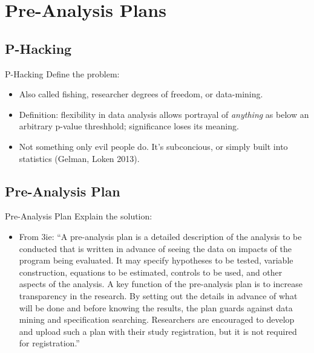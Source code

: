 \documentclass{beamer}
\begin{document}
\section{Pre-Analysis Plans}
\subsection*{P-Hacking}
\begin{frame}[<.->]{P-Hacking}
Define the problem:
\begin{itemize}
\item
Also called fishing, researcher degrees of freedom, or data-mining.
\item
Definition: flexibility in data analysis allows portrayal of \textit{anything} as below an arbitrary p-value threshhold; significance loses its meaning.
\item
Not something only evil people do. It's subconcious, or simply built into statistics (Gelman, Loken 2013).
\end{itemize}
\end{frame}

\subsection*{Pre-Analysis Plan}
\begin{frame}{Pre-Analysis Plan}
Explain the solution:
\begin{itemize}
\item
From 3ie: ``A pre-analysis plan is a detailed description of the analysis to be conducted that is written in advance of seeing the data on impacts of the program being evaluated. It may specify hypotheses to be tested, variable construction, equations to be estimated, controls to be used, and other aspects of the analysis. A key function of the pre-analysis plan is to increase transparency in the research. By setting out the details in advance of what will be done and before knowing the results, the plan guards against data mining and specification searching. Researchers are encouraged to develop and upload such a plan with their study registration, but it is not required for registration.''
\end{itemize}
\end{frame}
\end{document}

